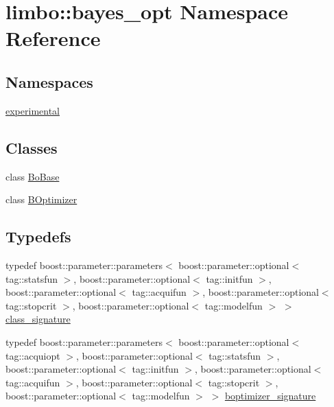 \hypertarget{namespacelimbo_1_1bayes__opt}{}\section{limbo\+:\+:bayes\+\_\+opt Namespace Reference}
\label{namespacelimbo_1_1bayes__opt}
\subsection*{Namespaces}
\begin{DoxyCompactItemize}
\item 
 \hyperlink{namespacelimbo_1_1bayes__opt_1_1experimental}{experimental}
\end{DoxyCompactItemize}
\subsection*{Classes}
\begin{DoxyCompactItemize}
\item 
class \hyperlink{classlimbo_1_1bayes__opt_1_1_bo_base}{Bo\+Base}
\item 
class \hyperlink{classlimbo_1_1bayes__opt_1_1_b_optimizer}{B\+Optimizer}
\end{DoxyCompactItemize}
\subsection*{Typedefs}
\begin{DoxyCompactItemize}
\item 
typedef boost\+::parameter\+::parameters$<$ boost\+::parameter\+::optional$<$ tag\+::statsfun $>$, boost\+::parameter\+::optional$<$ tag\+::initfun $>$, boost\+::parameter\+::optional$<$ tag\+::acquifun $>$, boost\+::parameter\+::optional$<$ tag\+::stopcrit $>$, boost\+::parameter\+::optional$<$ tag\+::modelfun $>$ $>$ \hyperlink{namespacelimbo_1_1bayes__opt_ac9ebb02d293842625e1ee8bac9710989}{class\+\_\+signature}
\item 
typedef boost\+::parameter\+::parameters$<$ boost\+::parameter\+::optional$<$ tag\+::acquiopt $>$, boost\+::parameter\+::optional$<$ tag\+::statsfun $>$, boost\+::parameter\+::optional$<$ tag\+::initfun $>$, boost\+::parameter\+::optional$<$ tag\+::acquifun $>$, boost\+::parameter\+::optional$<$ tag\+::stopcrit $>$, boost\+::parameter\+::optional$<$ tag\+::modelfun $>$ $>$ \hyperlink{namespacelimbo_1_1bayes__opt_aef2e9f6b642760d428c30abd9d12a61e}{boptimizer\+\_\+signature}
\end{DoxyCompactItemize}


